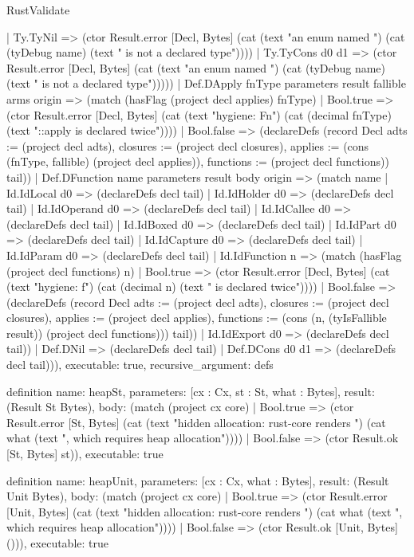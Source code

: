 \begin{lexlean}{RustValidate}
\begin{semanticmodule}
{        | Ty.TyNil => (ctor Result.error [Decl, Bytes] (cat (text "an enum named ") (cat (tyDebug name) (text " is not a declared type"))))
        | Ty.TyCons d0 d1 => (ctor Result.error [Decl, Bytes] (cat (text "an enum named ") (cat (tyDebug name) (text " is not a declared type")))))
      | Def.DApply fnType parameters result fallible arms origin => (match (hasFlag (project decl applies) fnType)
        | Bool.true => (ctor Result.error [Decl, Bytes] (cat (text "hygiene: Fn") (cat (decimal fnType) (text "::apply is declared twice"))))
        | Bool.false => (declareDefs (record Decl {adts := (project decl adts), closures := (project decl closures), applies := (cons (fnType, fallible) (project decl applies)), functions := (project decl functions)}) tail))
      | Def.DFunction name parameters result body origin => (match name
        | Id.IdLocal d0 => (declareDefs decl tail)
        | Id.IdHolder d0 => (declareDefs decl tail)
        | Id.IdOperand d0 => (declareDefs decl tail)
        | Id.IdCallee d0 => (declareDefs decl tail)
        | Id.IdBoxed d0 => (declareDefs decl tail)
        | Id.IdPart d0 => (declareDefs decl tail)
        | Id.IdCapture d0 => (declareDefs decl tail)
        | Id.IdParam d0 => (declareDefs decl tail)
        | Id.IdFunction n => (match (hasFlag (project decl functions) n)
          | Bool.true => (ctor Result.error [Decl, Bytes] (cat (text "hygiene: f") (cat (decimal n) (text " is declared twice"))))
          | Bool.false => (declareDefs (record Decl {adts := (project decl adts), closures := (project decl closures), applies := (project decl applies), functions := (cons (n, (tyIsFallible result)) (project decl functions))}) tail))
        | Id.IdExport d0 => (declareDefs decl tail))
      | Def.DNil => (declareDefs decl tail)
      | Def.DCons d0 d1 => (declareDefs decl tail))),
  executable: true,
  recursive_argument: defs
}

definition{
  name: heapSt,
  parameters: [cx : Cx, st : St, what : Bytes],
  result: (Result St Bytes),
  body: (match (project cx core)
    | Bool.true => (ctor Result.error [St, Bytes] (cat (text "hidden allocation: rust-core renders ") (cat what (text ", which requires heap allocation"))))
    | Bool.false => (ctor Result.ok [St, Bytes] st)),
  executable: true
}

definition{
  name: heapUnit,
  parameters: [cx : Cx, what : Bytes],
  result: (Result Unit Bytes),
  body: (match (project cx core)
    | Bool.true => (ctor Result.error [Unit, Bytes] (cat (text "hidden allocation: rust-core renders ") (cat what (text ", which requires heap allocation"))))
    | Bool.false => (ctor Result.ok [Unit, Bytes] ())),
  executable: true
}


\end{semanticmodule}
\end{lexlean}

